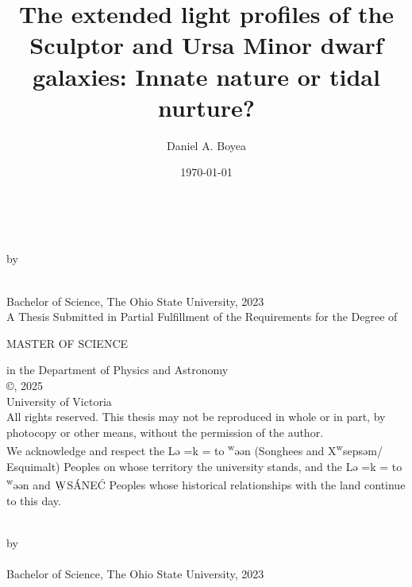 \documentclass[12pt,oneside,letterpaper]{report}
\title{
    The extended light profiles of the Sculptor and Ursa Minor dwarf galaxies: Innate nature or tidal nurture?
}
\author{Daniel A. Boyea}
\date{\today}
\newcommand{\schwa}{ə}
\newcommand{\Lekwnen}{L\schwa{}\overcomma{k}\textsuperscript{w}\schwa{}\ng{}\schwa{}n}
\newcommand{\skipline}{\vspace{\baselineskip}}
\def\overcomma#1{%
  \setbox0=\hbox{#1}%
  \dimen0=\wd0       %
  \vbox{%
    \hbox to \dimen0{\hfil,\hfil}%
    \nointerlineskip            %
    \box0                       %
  }%
}
\begin{document}


\makeatletter
\begin{titlepage}
   \begin{center}
       \textbf{\large \@title}\\
        \skipline

        by\\
        \skipline

       \@author\\
       Bachelor of Science, The Ohio State University, 2023\\
       \vspace*{3\baselineskip}
    A Thesis Submitted in Partial Fulfillment of the Requirements for the Degree of\\
    \skipline

    MASTER OF SCIENCE \\
    \skipline

    in the Department of Physics and Astronomy\\
       \vfill
       {\small
       ©\@author, 2025\\
       University of Victoria\\
   }
   \skipline
       {\small
       All rights reserved. This thesis may not be reproduced in whole or in part,
   by photocopy or other means, without the permission of the author.} \\
\skipline
   {\small
We acknowledge and respect the \Lekwnen{} (Songhees and X\textsuperscript{w}seps\schwa{}m/
Esquimalt) Peoples on whose territory the university stands, and the
\Lekwnen{} and ${\underaccent{\bar}{\rm W}}$S\'ANE\'C Peoples whose historical relationships with the
land continue to this day. 
}
   \end{center}

\end{titlepage}

\addtocounter{page}{1}


{}
\begin{centering}
\textbf{\@title}\\
\skipline
by\\
\skipline
\@author\\
Bachelor of Science, The Ohio State University, 2023\\
\vspace*{3\baselineskip}
\end{centering}
\end{document}
